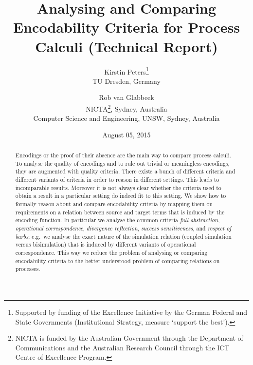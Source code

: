 \documentclass[11pt,a4paper]{article}
\begin{document}
\title{Analysing and Comparing Encodability Criteria for Process Calculi (Technical Report)}
\author{
	\begin{tabular}{c}
		Kirstin Peters\thanks{Supported by funding of the Excellence Initiative by the German Federal and State Governments (Institutional Strategy, measure `support the best').}\\
		\begin{small}
			TU Dresden, Germany
		\end{small}
	\end{tabular}
	\and
	\begin{tabular}{c}
		Rob van Glabbeek\\
		\begin{small}
			NICTA\thanks{NICTA is funded by the Australian Government through the Department of Communications and the Australian Research Council through the ICT Centre of Excellence Program.}, Sydney, Australia
		\end{small}\\
		\begin{small}
			Computer Science and Engineering, UNSW, Sydney, Australia
		\end{small}
	\end{tabular}
}
\date{August 05, 2015}
\maketitle

\begin{abstract}
	Encodings or the proof of their absence are the main way to compare process calculi. To analyse the quality of encodings and to rule out trivial or meaningless encodings, they are augmented with quality criteria.
	There exists a bunch of different criteria and different variants of criteria in order to reason in different settings. This leads to incomparable results.
	Moreover it is not always clear whether the criteria used to obtain a result in a particular setting do indeed fit to this setting.
	We show how to formally reason about and compare encodability criteria by mapping them on requirements on a relation between source and target terms that is induced by the encoding function.
	In particular we analyse the common criteria \emph{full abstraction}, \emph{operational correspondence}, \emph{divergence reflection}, \emph{success sensitiveness}, and \emph{respect of barbs}; e.g.\ we analyse the exact nature of the simulation relation (coupled simulation versus bisimulation) that is induced by different variants of operational correspondence.
	This way we reduce the problem of analysing or comparing encodability criteria to the better understood problem of comparing relations on processes.
\end{abstract}
\end{document}
